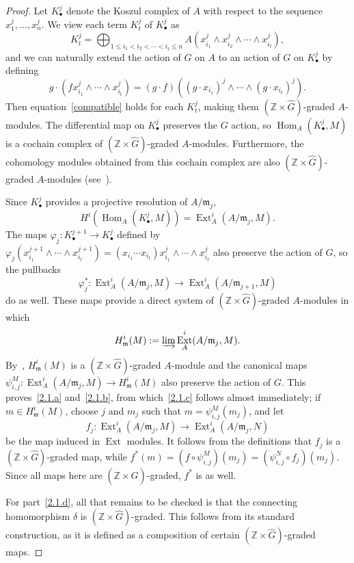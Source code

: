 \documentclass[10pt]{amsart}
\theoremstyle{definition}
\DeclareMathOperator{\Hom}{Hom}
\DeclareMathOperator{\Ext}{Ext}
\newcommand{\ZZ}{{\mathbb Z}}
\newcommand{\mideal}{\ensuremath{\mathfrak{m}}}
\begin{document}
\begin{proof}
Let $K_\bullet^j$ denote the Koszul complex of $A$ with respect to the sequence $x_1^j, \ldots, x_n^j$. We view each term $K_t^j$ of $K_\bullet^j$ as
\[
K_t^j = \bigoplus_{1\le i_1<i_2<\cdots<i_t\le n}A(x_{i_1}^{j}\wedge x_{i_2}^{j}\wedge\cdots\wedge x_{i_t}^{j}),
\]
and we can naturally extend the action of $G$ on $A$ to an action of $G$ on $K_\bullet^j$ by defining
\[
g\cdot \left(f x_{i_1}^{j}\wedge\cdots\wedge x_{i_t}^{j}\right) = (g\cdot f)((g\cdot x_{i_1})^j\wedge\cdots\wedge (g\cdot x_{i_t})^j).
\]
Then equation~\eqref{compatible} holds for each $K_t^j$, making them $(\ZZ\times \hat{G})$-graded $A$-modules. The differential map on $K_\bullet^j$ preserves the $G$ action, so $\Hom_A(K_\bullet^j, M)$ is a cochain complex of $(\ZZ\times \hat{G})$-graded $A$-modules. Furthermore, the cohomology modules obtained from this cochain complex are also $(\ZZ\times \hat{G})$-graded $A$-modules (see~\cite[Proposition~II.11.3.3]{Bourbaki}).

Since $K_\bullet^j$ provides a projective resolution of $A/\mideal_j$,
\[
H^i(\Hom_A(K_\bullet^j, M))=\Ext_A^i(A/\mideal_j, M).
\]
The maps $\varphi_j :K_\bullet^{j+1}\to K_\bullet^j$ defined by $\varphi_j(x_{i_1}^{j+1}\wedge \cdots\wedge x_{i_t}^{j+1})=(x_{i_1}\!\cdots x_{i_t})x_{i_1}^{j}\wedge \cdots\wedge x_{i_t}^{j}$ also preserve the action of $G$, so the pullbacks
\[
\varphi_j^*:\Ext_A^i(A/\mideal_j, M)\to\Ext_A^i(A/\mideal_{j+1}, M)
\]
do as well. These maps provide a direct system of $(\ZZ\times \hat{G})$-graded $A$-modules in which
\[
H_\mideal^i(M):=\varinjlim\Ext_A^i(A/\mideal_j, M).
\]
By~\cite[Remark~II.11.3.3]{Bourbaki}, $H_\mideal^i(M)$ is a $(\ZZ\times \hat{G})$-graded $A$-module and the canonical maps $\psi_{i, j}^M:\Ext_A^i(A/\mideal_j, M)\to H_\mideal^i(M)$ also preserve the action of $G$. This proves~\eqref{2.1.a} and~\eqref{2.1.b}, from which~\eqref{2.1.c} follows almost immediately; if $m\in H_\mideal^i(M)$, choose $j$ and $m_j$ such that $m=\psi_{i, j}^M(m_j)$, and let
\[
f_j: \Ext_A^i(A/\mideal_j, M)\to \Ext_A^i(A/\mideal_j, N)
\]
be the map induced in $\Ext$ modules. It follows from the definitions that $f_j$ is a $(\ZZ\times\hat{G})$-graded map, while $f^*(m)=(f\circ \psi_{i, j}^M)(m_j)=(\psi_{i, j}^N\circ f_j)(m_j)$. Since all maps here are $(\ZZ\times\hat{G})$-graded, $f^*$ is as well.

For part~\eqref{2.1.d}, all that remains to be checked is that the connecting homomorphism $\delta$ is $(\ZZ\times\hat{G})$-graded. This follows from its standard construction, as it is defined as a composition of certain $(\ZZ\times\hat{G})$-graded maps.
\end{proof}
\end{document}

